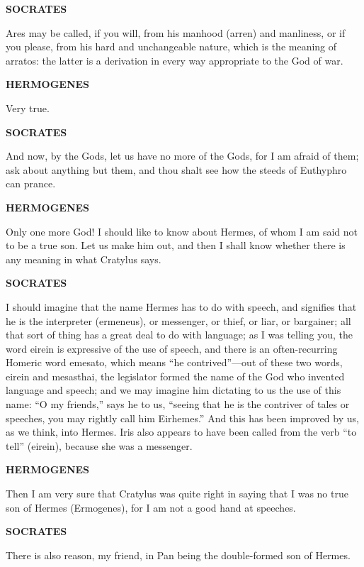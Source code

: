 \documentclass[11pt,letter]{article}
\begin{document}
\par \textbf{SOCRATES}
\par   Ares may be called, if you will, from his manhood (arren) and manliness, or if you please, from his hard and unchangeable nature, which is the meaning of arratos:  the latter is a derivation in every way appropriate to the God of war.

\par \textbf{HERMOGENES}
\par   Very true.

\par \textbf{SOCRATES}
\par   And now, by the Gods, let us have no more of the Gods, for I am afraid of them; ask about anything but them, and thou shalt see how the steeds of Euthyphro can prance.

\par \textbf{HERMOGENES}
\par   Only one more God! I should like to know about Hermes, of whom I am said not to be a true son. Let us make him out, and then I shall know whether there is any meaning in what Cratylus says.

\par \textbf{SOCRATES}
\par   I should imagine that the name Hermes has to do with speech, and signifies that he is the interpreter (ermeneus), or messenger, or thief, or liar, or bargainer; all that sort of thing has a great deal to do with language; as I was telling you, the word eirein is expressive of the use of speech, and there is an often-recurring Homeric word emesato, which means “he contrived”—out of these two words, eirein and mesasthai, the legislator formed the name of the God who invented language and speech; and we may imagine him dictating to us the use of this name:  “O my friends,” says he to us, “seeing that he is the contriver of tales or speeches, you may rightly call him Eirhemes.” And this has been improved by us, as we think, into Hermes. Iris also appears to have been called from the verb “to tell” (eirein), because she was a messenger.

\par \textbf{HERMOGENES}
\par   Then I am very sure that Cratylus was quite right in saying that I was no true son of Hermes (Ermogenes), for I am not a good hand at speeches.

\par \textbf{SOCRATES}
\par   There is also reason, my friend, in Pan being the double-formed son of Hermes.
\end{document}
